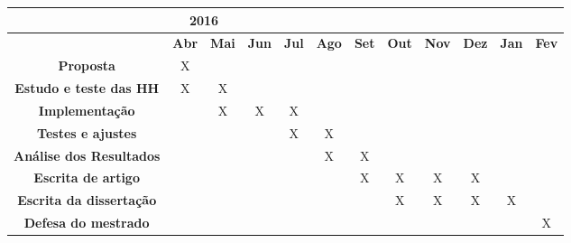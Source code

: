 {\begin{table}[!hbt]
\begin{tabular}{|c|c|c|c|c|c|c|c|c|c|c|c|}
              & \multicolumn{2}{c|}{2016}       \\ \hline
                      & \textbf{Abr} & \textbf{Mai} & \textbf{Jun} & 
\textbf{Jul} & \textbf{Ago} & \textbf{Set} & \textbf{Out} & 
\textbf{Nov} & \textbf{Dez} & \textbf{Jan} & \textbf{Fev} \\ \hline
\textbf{Proposta}           & X              &                &                
&      
          &                &                &                &                & 
               &                &                \\ \hline
\textbf{Estudo e teste das HH}           & X              & X    
          &                &      
          &                &                &                &                & 
               &                &                \\ \hline
\textbf{Implementação}           &                & X              & X          
    & X    
          &                &                &                &                & 
               &                &                \\ \hline
\textbf{Testes e ajustes}           &                &                &         
       & X    
          & X              &                &                &                & 
               &                &                \\ \hline
\textbf{Análise dos Resultados}           &                &                &   
             &      
          & X              & X              &                &                & 
               &                &                \\ \hline
\textbf{Escrita de artigo}           &                &                &        
        &      
          &                & X              & X              & X              & 
X              &                &                \\ \hline
\textbf{Escrita da dissertação}           &                &                &   
             &      
          &                &                & X              & X              & 
X              & X              &                \\ \hline
\textbf{Defesa do mestrado}           &                &                &       
         &      
          &                &                &                &                & 
               &                & X              \\ \hline
\end{tabular}
\end{table}

}